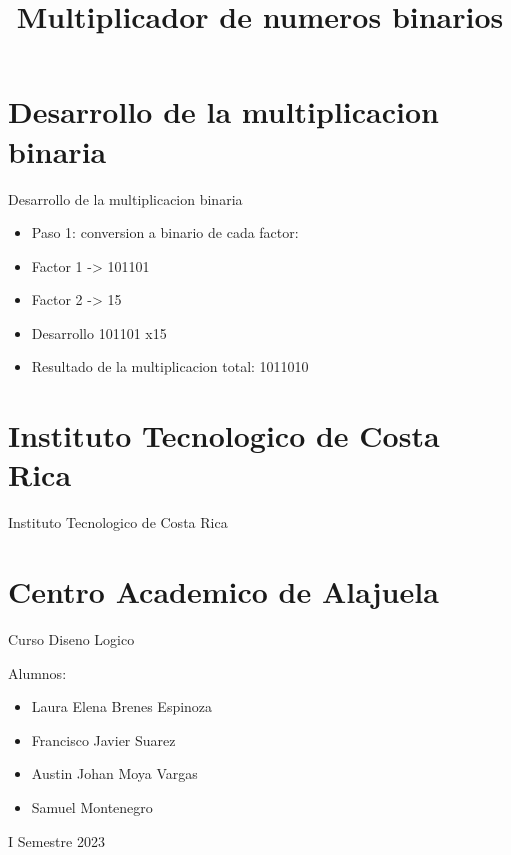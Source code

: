 \documentclass[11pt]{beamer}
\title{Multiplicador de numeros binarios}
\begin{document}
    \begin{frame}
        \maketitle
    \end{frame}
    \section{Desarrollo de la multiplicacion binaria}
    \begin{frame}{Desarrollo de la multiplicacion binaria}
        \begin{itemize}
        \item Paso 1: conversion a binario de cada factor:
        \item    Factor 1 -> 101101
        \item    Factor 2 -> 15
        \item Desarrollo 
        \newline
      \hphantom{123456789101112}101101
        \newline      \hphantom{12345678910111}x15
        \item Resultado de la multiplicacion total: 1011010
        \end{itemize}
    \end{frame}
    \section{Instituto Tecnologico de Costa Rica}
    \begin{frame}{Instituto Tecnologico de Costa Rica}    \section{Centro Academico de Alajuela}        Curso Diseno Logico 
        \newline

        Alumnos:
        \begin{itemize}
        \item Laura Elena Brenes Espinoza
        \item Francisco Javier Suarez 
        \item Austin Johan Moya Vargas
        \item Samuel Montenegro
        \end{itemize}

        I Semestre 2023
    \end{frame}
    
\end{document}
